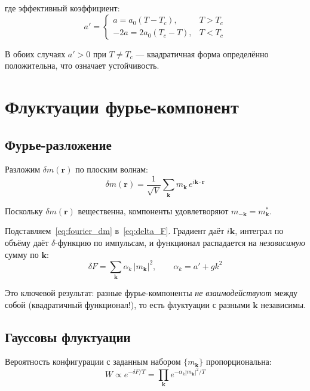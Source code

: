 \documentclass[../general/general]{subfiles}
\begin{document}
где эффективный коэффициент:
\begin{equation}
    a' = \begin{cases} a = a_0(T - T_c), & T > T_c \\ -2a = 2a_0(T_c - T), & T < T_c \end{cases}
\end{equation}

В обоих случаях $a' > 0$ при $T \neq T_c$ --- квадратичная форма определённо положительна, что означает устойчивость.


\section{Флуктуации фурье-компонент}

\subsection{Фурье-разложение}

Разложим $\delta m(\mathbf{r})$ по плоским волнам:
\begin{equation}
    \delta m(\mathbf{r}) = \frac{1}{\sqrt{V}}\sum_\mathbf{k} m_\mathbf{k}\,e^{i\mathbf{k}\cdot\mathbf{r}}
    \label{eq:fourier_dm}
\end{equation}

Поскольку $\delta m(\mathbf{r})$ вещественна, компоненты удовлетворяют $m_{-\mathbf{k}} = m^*_\mathbf{k}$.

Подставляем~\eqref{eq:fourier_dm} в~\eqref{eq:delta_F}. Градиент даёт $i\mathbf{k}$, интеграл по объёму даёт $\delta$-функцию по импульсам, и функционал распадается на \emph{независимую} сумму по $\mathbf{k}$:
\begin{equation}
    \delta F = \sum_\mathbf{k} \alpha_k\,|m_\mathbf{k}|^2, \qquad \alpha_k = a' + gk^2
    \label{eq:delta_F_k}
\end{equation}

Это ключевой результат: разные фурье-компоненты \emph{не взаимодействуют} между собой (квадратичный функционал!), то есть флуктуации с разными $\mathbf{k}$ независимы.

\subsection{Гауссовы флуктуации}

Вероятность конфигурации с заданным набором $\{m_\mathbf{k}\}$ пропорциональна:
\begin{equation}
    W \propto e^{-\delta F/T} = \prod_\mathbf{k} e^{-\alpha_k |m_\mathbf{k}|^2/T}
\end{equation}
\end{document}

